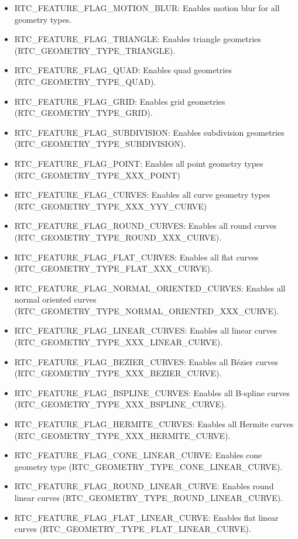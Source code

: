 \begin{itemize}
\item
  RTC\_FEATURE\_FLAG\_MOTION\_BLUR: Enables motion blur for all geometry
  types.
\item
  RTC\_FEATURE\_FLAG\_TRIANGLE: Enables triangle geometries
  (RTC\_GEOMETRY\_TYPE\_TRIANGLE).
\item
  RTC\_FEATURE\_FLAG\_QUAD: Enables quad geometries
  (RTC\_GEOMETRY\_TYPE\_QUAD).
\item
  RTC\_FEATURE\_FLAG\_GRID: Enables grid geometries
  (RTC\_GEOMETRY\_TYPE\_GRID).
\item
  RTC\_FEATURE\_FLAG\_SUBDIVISION: Enables subdivision geometries
  (RTC\_GEOMETRY\_TYPE\_SUBDIVISION).
\item
  RTC\_FEATURE\_FLAG\_POINT: Enables all point geometry types
  (RTC\_GEOMETRY\_TYPE\_XXX\_POINT)
\item
  RTC\_FEATURE\_FLAG\_CURVES: Enables all curve geometry types
  (RTC\_GEOMETRY\_TYPE\_XXX\_YYY\_CURVE)
\item
  RTC\_FEATURE\_FLAG\_ROUND\_CURVES: Enables all round curves
  (RTC\_GEOMETRY\_TYPE\_ROUND\_XXX\_CURVE).
\item
  RTC\_FEATURE\_FLAG\_FLAT\_CURVES: Enables all flat curves
  (RTC\_GEOMETRY\_TYPE\_FLAT\_XXX\_CURVE).
\item
  RTC\_FEATURE\_FLAG\_NORMAL\_ORIENTED\_CURVES: Enables all normal
  oriented curves (RTC\_GEOMETRY\_TYPE\_NORMAL\_ORIENTED\_XXX\_CURVE).
\item
  RTC\_FEATURE\_FLAG\_LINEAR\_CURVES: Enables all linear curves
  (RTC\_GEOMETRY\_TYPE\_XXX\_LINEAR\_CURVE).
\item
  RTC\_FEATURE\_FLAG\_BEZIER\_CURVES: Enables all Bézier curves
  (RTC\_GEOMETRY\_TYPE\_XXX\_BEZIER\_CURVE).
\item
  RTC\_FEATURE\_FLAG\_BSPLINE\_CURVES: Enables all B-spline curves
  (RTC\_GEOMETRY\_TYPE\_XXX\_BSPLINE\_CURVE).
\item
  RTC\_FEATURE\_FLAG\_HERMITE\_CURVES: Enables all Hermite curves
  (RTC\_GEOMETRY\_TYPE\_XXX\_HERMITE\_CURVE).
\item
  RTC\_FEATURE\_FLAG\_CONE\_LINEAR\_CURVE: Enables cone geometry type
  (RTC\_GEOMETRY\_TYPE\_CONE\_LINEAR\_CURVE).
\item
  RTC\_FEATURE\_FLAG\_ROUND\_LINEAR\_CURVE: Enables round linear curves
  (RTC\_GEOMETRY\_TYPE\_ROUND\_LINEAR\_CURVE).
\item
  RTC\_FEATURE\_FLAG\_FLAT\_LINEAR\_CURVE: Enables flat linear curves
  (RTC\_GEOMETRY\_TYPE\_FLAT\_LINEAR\_CURVE).

\end{itemize}
